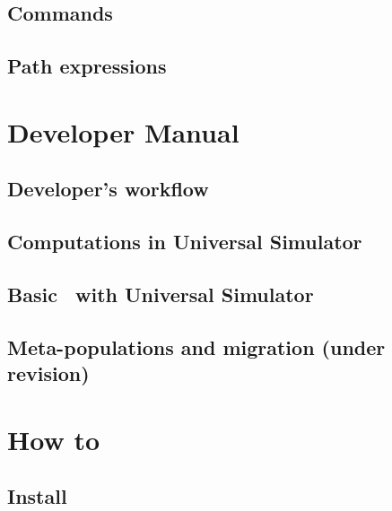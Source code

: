 \documentclass [a4paper, 11pt, openany]  {memoir}
\begin{document}
\chapter{Commands}

\chapter{Path expressions}


\part{Developer Manual}

\chapter{Developer's workflow}

\chapter{Computations in Universal Simulator}

\chapter{Basic \protect\CPP\ with Universal Simulator}

\chapter{Meta-populations and migration (under revision)}


\part{How to}

\chapter{Install \protect\US}
\end{document}
